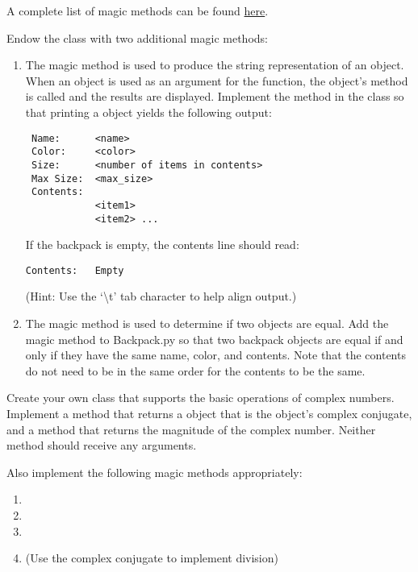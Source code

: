A complete list of magic methods can be found \href{https://docs.python.org/2/reference/datamodel.html#special-method-names}{here}.

\begin{problem}
Endow the  class with two additional magic methods:
\begin{enumerate}
\item The  magic method is used to produce the string representation of an object.
When an object is used as an argument for the  function, the object's  method is called and the results are displayed.
Implement the  method in the  class so that printing a  object yields the following output:
\begin{lstlisting}
 Name:		<name>
 Color:		<color>
 Size:		<number of items in contents>
 Max Size:	<max_size>
 Contents:
 			<item1>
 			<item2> ...
\end{lstlisting}
If the backpack is empty, the contents line should read:
\begin{lstlisting}
Contents:	Empty
\end{lstlisting}
(Hint: Use the `\textbackslash{t}' tab character to help align output.)

\item The  magic method is used to determine if two objects are equal. Add the  magic method to Backpack.py so that two backpack objects are equal if and only if they have the same name, color, and contents. Note that the contents do not need to be in the same order for the contents to be the same.
\end{enumerate}
\end{problem}

\begin{problem}
Create your own  class that supports the basic operations of complex numbers. Implement a  method that returns a  object that is the object's complex conjugate, and a  method that returns the magnitude of the complex number.
Neither method should receive any arguments.

Also implement the following magic methods appropriately:
\begin{enumerate}
\item {}
\item {}
\item {}
\item {} (Use the complex conjugate to implement division)
\end{enumerate}
\end{problem}
